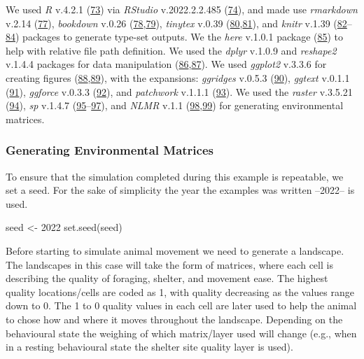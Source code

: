 \documentclass[10pt,a4paper]{article}
\newenvironment{Shaded}{}{}
\newcommand{\DecValTok}[1]{#1}
\newcommand{\FunctionTok}[1]{#1}
\newcommand{\NormalTok}[1]{#1}
\newcommand{\OtherTok}[1]{#1}
\begin{document}
We used \emph{R} v.4.2.1 (\protect\hyperlink{ref-R-base}{73}) via \emph{RStudio} v.2022.2.2.485 (\protect\hyperlink{ref-RStudioTeam2021}{74}), and made use \emph{rmarkdown} v.2.14 (\protect\hyperlink{ref-rmarkdown2020}{77}), \emph{bookdown} v.0.26 (\protect\hyperlink{ref-bookdown2016}{78},\protect\hyperlink{ref-R-bookdown}{79}), \emph{tinytex} v.0.39 (\protect\hyperlink{ref-tinytex2019}{80},\protect\hyperlink{ref-R-tinytex}{81}), and \emph{knitr} v.1.39 (\protect\hyperlink{ref-knitr2015}{82}--\protect\hyperlink{ref-R-knitr}{84}) packages to generate type-set outputs.
We the \emph{here} v.1.0.1 package (\protect\hyperlink{ref-R-here}{85}) to help with relative file path definition.
We used the \emph{dplyr} v.1.0.9 and \emph{reshape2} v.1.4.4 packages for data manipulation (\protect\hyperlink{ref-R-dplyr}{86},\protect\hyperlink{ref-reshape22007}{87}).
We used \emph{ggplot2} v.3.3.6 for creating figures (\protect\hyperlink{ref-R-ggplot2}{88},\protect\hyperlink{ref-ggplot22016}{89}), with the expansions: \emph{ggridges} v.0.5.3 (\protect\hyperlink{ref-R-ggridges}{90}), \emph{ggtext} v.0.1.1 (\protect\hyperlink{ref-R-ggtext}{91}), \emph{ggforce} v.0.3.3 (\protect\hyperlink{ref-R-ggforce}{92}), and \emph{patchwork} v.1.1.1 (\protect\hyperlink{ref-R-patchwork}{93}).
We used the \emph{raster} v.3.5.21 (\protect\hyperlink{ref-R-raster}{94}), \emph{sp} v.1.4.7 (\protect\hyperlink{ref-sp2013}{95}--\protect\hyperlink{ref-R-sp}{97}), and \emph{NLMR} v.1.1 (\protect\hyperlink{ref-NLMR2018}{98},\protect\hyperlink{ref-R-NLMR}{99}) for generating environmental matrices.

\hypertarget{generating-environmental-matrices}{%
\subsubsection{Generating Environmental Matrices}\label{generating-environmental-matrices}}

To ensure that the simulation completed during this example is repeatable, we set a seed.
For the sake of simplicity the year the examples was written --2022-- is used.

\begin{Shaded}
\begin{Highlighting}[]
\NormalTok{seed }\OtherTok{\textless{}{-}} \DecValTok{2022}
\FunctionTok{set.seed}\NormalTok{(seed)}
\end{Highlighting}
\end{Shaded}

Before starting to simulate animal movement we need to generate a landscape.
The landscapes in this case will take the form of matrices, where each cell is describing the quality of foraging, shelter, and movement ease.
The highest quality locations/cells are coded as 1, with quality decreasing as the values range down to 0.
The 1 to 0 quality values in each cell are later used to help the animal to chose how and where it moves throughout the landscape.
Depending on the behavioural state the weighing of which matrix/layer used will change (e.g., when in a resting behavioural state the shelter site quality layer is used).
\end{document}
